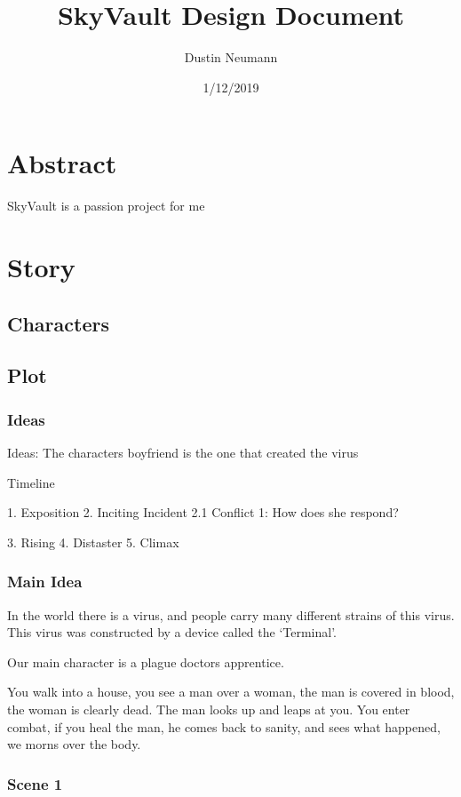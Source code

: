 \documentclass{article}
\begin{document}
\author{Dustin Neumann}
\title{SkyVault Design Document}
\date{1/12/2019}
\maketitle

\section{Abstract}
SkyVault is a passion project for me

\section{Story} 

\subsection{Characters}
\subsection{Plot}

\subsubsection{Ideas}
Ideas:
The characters boyfriend is the one that created the virus

\begin{bfseries}
    Timeline
\end{bfseries}


1. Exposition
2. Inciting Incident
    2.1 Conflict 1: How does she respond?

3. Rising
4. Distaster
5. Climax

\subsubsection{Main Idea}
In the world there is a virus, and people carry many different strains of this virus. This virus was constructed by a device called the `Terminal'.

Our main character is a plague doctors apprentice.

You walk into a house, you see a man over a woman, the man is covered in blood, the woman is clearly dead. The man looks up and leaps at you. You enter combat, if you heal the man, he comes back to sanity, and sees what happened, we morns over the body.

\subsubsection{Scene 1}
\end{document}
